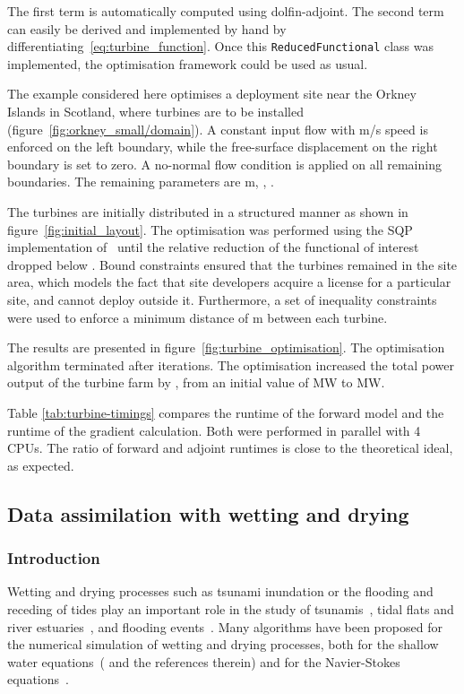 \documentclass[prodmode,acmtoms]{acmsmall}
\newcommand{\da}{\mbox{{dolfin-adjoint}}\xspace}
\begin{document}
The first term is automatically computed using \da.
The second term can easily be derived and implemented by hand by differentiating~\eqref{eq:turbine_function}.
Once this \texttt{ReducedFunctional} class was implemented, the optimisation framework could be used as usual.

The example considered here optimises a deployment site near the Orkney Islands in Scotland, where  turbines are to be installed (figure~\ref{fig:orkney_small/domain}).
A constant input flow with  m/s speed is enforced on the left boundary, while the free-surface displacement on the right boundary is set to zero.
A no-normal flow condition is applied on all remaining boundaries. 
The remaining parameters are  m, , .

The turbines are initially distributed in a structured manner as shown in figure~\ref{fig:initial_layout}. 
The optimisation was performed using the SQP implementation of~ until the relative reduction of the functional of interest dropped below .
Bound constraints ensured that the turbines remained in the site area, which models the fact
that site developers acquire a license for a particular site, and cannot deploy outside it.
Furthermore, a set of inequality constraints were used to enforce a minimum distance of  m between each turbine.

The results are presented in figure~\ref{fig:turbine_optimisation}.
The optimisation algorithm terminated after  iterations. The optimisation increased the total power output of the turbine farm by , from an initial value of  MW to  MW.

Table \ref{tab:turbine-timings} compares the runtime of the forward model and the runtime of the gradient calculation.
Both were performed in parallel with 4 CPUs. 
The ratio of forward and adjoint runtimes is close to the theoretical ideal, as expected.  

\subsection{Data assimilation with wetting and drying}
\subsubsection{Introduction}
Wetting and drying processes such as tsunami inundation or the flooding and receding of tides play an important role 
in the study of tsunamis~\cite{kowalik2004}, tidal flats and river estuaries~\cite{zhang2009,xue2010}, and flooding events~\cite{westerink2008,song2010}.
Many algorithms have been proposed for the numerical simulation of wetting and drying processes, 
both for the shallow water equations~( and the references therein) and for the Navier-Stokes equations~\cite{funke2011}.
\end{document}
